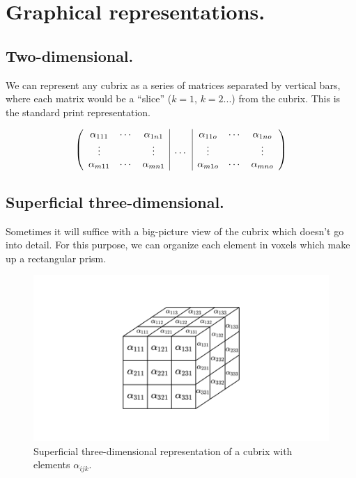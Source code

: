 \section{Graphical representations.}

\subsection{Two-dimensional.}

We can represent any cubrix as a series of matrices separated by vertical bars, where each matrix would be a ``slice'' ($k=1$, $k=2$...) from the cubrix. This is the standard print representation.

\[ \left(
\begin{array}{c c c | c | c c c}
	\alpha_{111} & \cdots & \alpha_{1n1} &        & \alpha_{11o} & \cdots & \alpha_{1no} \\
	\vdots       &        & \vdots       & \cdots & \vdots       &        & \vdots       \\
	\alpha_{m11} & \cdots & \alpha_{mn1} &        & \alpha_{m1o} & \cdots & \alpha_{mno} \\
\end{array} \right)
\]

\subsection{Superficial three-dimensional.}

Sometimes it will suffice with a big-picture view of the cubrix which doesn't go into detail. For this purpose, we can organize each element in voxels which make up a rectangular prism.

\begin{figure}[H]
	\includegraphics[width=\linewidth]{media/tridimensional_sup.png}
	\caption{Superficial three-dimensional representation of a cubrix with elements $\alpha_{ijk}$.}
\end{figure}

